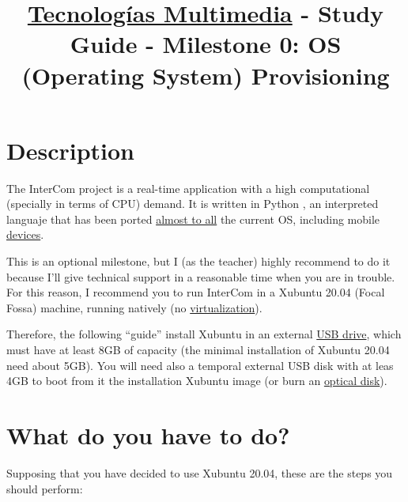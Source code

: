 \title{\href{https://www.ual.es/estudios/grados/presentacion/plandeestudios/asignatura/4015/40154321?idioma=zh_CN}{Tecnologías Multimedia} - Study Guide - Milestone 0: OS (Operating System) Provisioning}

\maketitle

\section{Description}

The InterCom project \cite{intercom} is a real-time application with
a high computational (specially in terms of CPU) demand. It is written
in Python \cite{Python}, an interpreted languaje that has been
ported \href{https://www.python.org/download/other/}{almost to all}
the current OS, including
mobile \href{https://kivy.org/#home}{devices}.

This is an optional milestone, but I (as the teacher) highly recommend
to do it because I'll give technical support in a reasonable time when
you are in trouble. For this reason, I recommend you to run InterCom
in a Xubuntu 20.04 (Focal Fossa) \cite{xubuntu} machine, running
natively
(no \href{https://en.wikipedia.org/wiki/Virtualization}{virtualization}).

Therefore, the following ``guide'' install Xubuntu in an
external \href{https://en.wikipedia.org/wiki/USB_flash_drive}{USB
drive}, which must have at least 8GB of capacity (the minimal
installation of Xubuntu 20.04 need about 5GB). You will need also a
temporal external USB disk with at leas 4GB to boot from it the
installation Xubuntu image (or burn
an \href{https://en.wikipedia.org/wiki/Optical_disc}{optical disk}).

\section{What do you have to do?}

Supposing that you have decided to use Xubuntu 20.04, these are the
steps you should perform:


